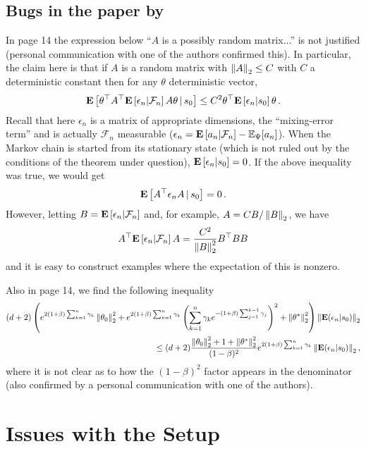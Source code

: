 \documentclass{article}
\begin{document}
\subsection{Bugs in the paper by  \cite{lstdicmla}}
In page 14 the expression below ``$A$ is a possibly random matrix...'' is not justified (personal communication with one of the authors confirmed this).  In particular, the claim here is that if $A$ is a random matrix with $\left\| A\right\|_2\le C$ with $C$ a deterministic constant then for any $\theta$ deterministic vector,
\begin{align*}
\mathbf{E}\left[ \theta^\top A^\top \mathbf{E}\left[ \epsilon_n | \mathcal{F}_n \right] A \theta \,|\, s_0 \right] \le C^2 \theta^\top \mathbf{E}\left[ \epsilon_n|s_0 \right] \theta\,.
\end{align*}
Recall that here $\epsilon_n$ is a matrix of appropriate dimensions, the ``mixing-error term''
and is actually $\mathcal{F}_n$ measurable ($\epsilon_n = \mathbf{E}\left[ a_n | \mathcal{F}_n \right] - \mathbb{E}_{\Psi}[a_n]$). 
When the Markov chain is started from its stationary state 
(which is not ruled out by the conditions of the theorem under question), $\mathbf{E}\left[ \epsilon_n|s_0 \right] = 0$.
If the above inequality was true, we would get 
\begin{align*}
\mathbf{E}\left[ A^\top \epsilon_n  A  \,|\, s_0 \right] = 0\,.
\end{align*}
However, letting $B = \mathbf{E}\left[\epsilon_n|\mathcal{F}_n\right]$ and, for example,
$A = C B/\left\|  B \right\|_2$, we have 
\begin{align*}
A^\top \mathbf{E}\left[ \epsilon_n | \mathcal{F}_n \right] A  = \frac{C^2}{\left\|  B \right\|_2^2} B^\top B B
\end{align*}
and it is easy to construct examples where the expectation of this is nonzero.

Also in page 14, we find the following inequality
\begin{align*}
(d+2)\left( e^{2(1+\beta)\sum_{k=1}^n \gamma_k}\left\| \theta_0\right\|^2_2+ e^{2(1+\beta)\sum_{k=1}^n \gamma_k}\left(\sum_{k=1}^n \gamma_k e^{-(1+\beta)\sum_{j=1}^{k-1} \gamma_j}\right)^2+\left\| \theta^*\right\|_2^2\right)\left\| \mathbf{E}(\epsilon_n|s_0)\right\|_2\\
\leq (d+2)\frac{\left\| \theta_0\right\|_2^2+1+\left\| \theta^*\right\|_2^2}{(1-\beta)^2}e^{2(1+\beta)\sum_{k=1}^n \gamma_k}\left\| \mathbf{E}(\epsilon_n|s_0)\right\|_2,
\end{align*}
where it is not clear as to how the $(1-\beta)^2$ factor appears in the denominator (also confirmed by a personal communication with one of the authors).

\section{Issues with the Setup}
\end{document}
